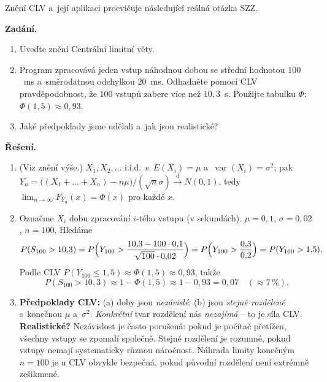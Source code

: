 \documentclass[11pt,a4paper]{article}
\DeclareMathOperator{\Var}{var}
\begin{document}
\noindent Znění CLV a~její aplikaci procvičuje následující reálná otázka SZZ.

\begin{priklad} \par

\textbf{Zadání.}
\begin{enumerate}[label=(\arabic*)]
  \item Uveďte znění Centrální limitní věty.
  \item Program zpracovává jeden vstup náhodnou dobou se střední hodnotou $100$~ms a~směrodatnou odchylkou $20$~ms. Odhadněte pomocí CLV pravděpodobnost, že $100$ vstupů zabere více než $10{,}3$~s. Použijte tabulku $\Phi$: $\Phi(1{,}5)\approx 0{,}93$.
  \item Jaké předpoklady jsme udělali a~jak jsou realistické?
\end{enumerate}

\textbf{Řešení.}

\begin{enumerate}[label=(\arabic*)]
  \item (Viz znění výše.) $X_1,X_2,\dots$ i.i.d.\ s~$E(X_i)=\mu$ a~$\Var(X_i)=\sigma^2$; pak $Y_n=\bigl((X_1+\dots+X_n)-n\mu\bigr)/(\sqrt n\sigma)\xrightarrow{d} N(0,1)$, tedy $\lim_{n\to\infty}F_{Y_n}(x)=\Phi(x)$ pro každé $x$.
  \item Označme $X_i$ dobu zpracování $i$-tého vstupu (v sekundách). $\mu=0{,}1$, $\sigma=0{,}02$, $n=100$. Hledáme
  \[
  P(S_{100}>10{,}3)=P\Bigl(Y_{100}>\frac{10{,}3-100\cdot 0{,}1}{\sqrt{100}\cdot 0{,}02}\Bigr)=P\Bigl(Y_{100}>\frac{0{,}3}{0{,}2}\Bigr)=P(Y_{100}>1{,}5).
  \]
  Podle CLV $P(Y_{100}\le 1{,}5)\approx \Phi(1{,}5)\approx 0{,}93$, takže
  \[
  P(S_{100}>10{,}3)\approx 1-\Phi(1{,}5)\approx 1-0{,}93=\boxed{0{,}07}\quad(\approx 7\,\%).
  \]
  \item \textbf{Předpoklady CLV:} (a) doby jsou \emph{nezávislé}; (b) jsou \emph{stejně rozdělené} s~konečnou $\mu$ a~$\sigma^2$. \emph{Konkrétní} tvar rozdělení nás \emph{nezajímá} -- to je síla CLV. \textbf{Realistické?} Nezávislost je často porušená: pokud je počítač přetížen, všechny vstupy se zpomalí společně. Stejné rozdělení je rozumné, pokud vstupy nemají systematicky různou náročnost. Náhrada limity konečným $n=100$ je u CLV obvykle bezpečná, pokud původní rozdělení není extrémně zešikmené.
\end{enumerate}
\end{priklad}
\end{document}
